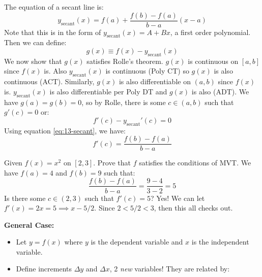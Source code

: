 \begin{itemize}
    \begin{prooof}
        The equation of a secant line is:
        \begin{equation}
            y_\text{secant}(x)=f(a)+\frac{f(b)-f(a)}{b-a}\left(x-a\right)
            \label{eq:13-secant}
        \end{equation}
        Note that this is in the form of $y_\text{secant}(x)=A+Bx$, a first order polynomial. Then we can define:
        \begin{equation}
            g(x)\equiv f(x)-y_\text{secant}(x)
            \label{eq:}
        \end{equation}
        We now show that $g(x)$ satisfies Rolle's theorem. $g(x)$ is continuous on $[a,b]$ since $f(x)$ is. Also $y_\text{secant}(x)$ is continuous (Poly CT) so $g(x)$ is also continuous (ACT). Similarly, $g(x)$ is also differentiable on $(a,b)$ since $f(x)$ is. $y_\text{secant}(x)$ is also differentiable per Poly DT and $g(x)$ is also (ADT). We have $g(a)=g(b)=0$, so by Rolle, there is some $c\in (a,b)$ such that $g'(c)=0$ or:
        \begin{equation}
            f'(c)-y_\text{secant}'(c)=0
            \label{eq:}
        \end{equation}
        Using equation \ref{eq:13-secant}, we have:
        \begin{equation}
            f'(c)=\frac{f(b)-f(a)}{b-a}
            \label{eq:}
        \end{equation}
    \end{prooof}
    \begin{example}
        Given $f(x)=x^2$ on $[2,3]$. Prove that $f$ satisfies the conditions of MVT. We have $f(a)=4$ and $f(b)=9$ such that:
        \begin{equation}
            \frac{f(b)-f(a)}{b-a}=\frac{9-4}{3-2}=5
            \label{eq:}
        \end{equation}
        Is there some $c\in (2,3)$ such that $f'(c)=5$? Yes! We can let $f'(x)=2x=5 \implies x-5/2$. Since $2<5/2<3$, then this all checks out.
    \end{example}
\begin{multicols}{2}
    \textbf{General Case:}
    \begin{itemize}
        \item Let $y=f(x)$ where $y$ is the dependent variable and $x$ is the independent variable.
        \item Define increments $\Delta y$ and $\Delta x$, 2 \textit{new} variables! They are related by:

\end{itemize}
\end{multicols}
\end{itemize}
